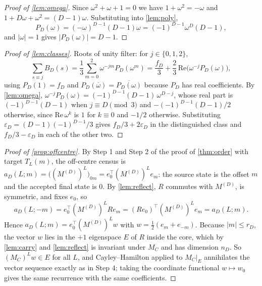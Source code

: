 \documentclass[11pt]{amsart}
\theoremstyle{definition}
\theoremstyle{remark}
\begin{document}
\begin{proof}[Proof of \cref{lem:omega}]
Since $\omega^2 + \omega + 1 = 0$ we have $1 + \omega^2 = -\omega$ and $1 + D\omega + \omega^2 = (D-1)\omega$. Substituting into \cref{lem:poly},
\[
P_D(\omega) = (-\omega)^{D-1}(D-1)\omega = (-1)^{D-1}\omega^D (D-1),
\]
and $\lvert \omega \rvert = 1$ gives $\lvert P_D(\omega) \rvert = D-1$.
\end{proof}

\begin{proof}[Proof of \cref{lem:classes}]
Roots of unity filter: for $j \in \{0,1,2\}$,
\[
\sum_{s \equiv j} B_D(s) = \frac{1}{3}\sum_{m=0}^{2} \omega^{-jm} P_D(\omega^m) = \frac{f_D}{3} + \frac{2}{3}\,\mathrm{Re}\bigl( \omega^{-j} P_D(\omega) \bigr),
\]
using $P_D(1) = f_D$ and $P_D(\overline{\omega}) = \overline{P_D(\omega)}$ because $P_D$ has real coefficients. By \cref{lem:omega}, $\omega^{-j}P_D(\omega) = (-1)^{D-1}(D-1)\,\omega^{D-j}$, whose real part is $(-1)^{D-1}(D-1)$ when $j \equiv D \pmod 3$ and $-(-1)^{D-1}(D-1)/2$ otherwise, since $\mathrm{Re}\,\omega^k$ is $1$ for $k \equiv 0$ and $-1/2$ otherwise. Substituting $\varepsilon_D = (D-1)(-1)^{D-1}/3$ gives $f_D/3 + 2\varepsilon_D$ in the distinguished class and $f_D/3 - \varepsilon_D$ in each of the other two.
\end{proof}

\begin{proof}[Proof of \cref{prop:offcentre}]
By Step 1 and Step 2 of the proof of \cref{thm:order} with target $T_L(m)$, the off-centre census is $a_D(L;m) = \bigl((M^{(D)})^L\bigr)_{0m} = e_0^{\top}(M^{(D)})^L e_m$: the source state is the offset $m$ and the accepted final state is $0$. By \cref{lem:reflect}, $R$ commutes with $M^{(D)}$, is symmetric, and fixes $e_0$, so
\[
a_D(L;-m) = e_0^{\top}(M^{(D)})^L R e_m = (Re_0)^{\top}(M^{(D)})^L e_m = a_D(L;m).
\]
Hence $a_D(L;m) = e_0^{\top}(M^{(D)})^L w$ with $w = \tfrac12 (e_m + e_{-m})$. Because $\lvert m \rvert \le r_D$, the vector $w$ lies in the $+1$ eigenspace $E$ of $R$ inside the core, which by \cref{lem:carry} and \cref{lem:reflect} is invariant under $M_C$ and has dimension $n_D$. So $(M_C)^L w \in E$ for all $L$, and Cayley--Hamilton applied to $M_C|_E$ annihilates the vector sequence exactly as in Step 4; taking the coordinate functional $w \mapsto w_0$ gives the same recurrence with the same coefficients.
\end{proof}
\end{document}
